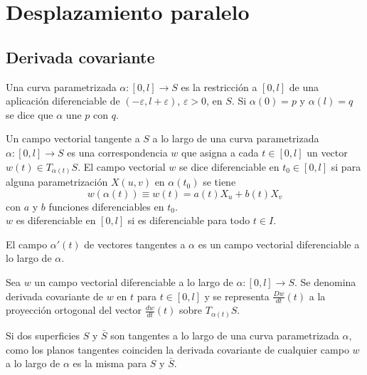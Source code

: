\chapter{Desplazamiento paralelo}
\section{Derivada covariante}

\begin{definition}
    Una curva parametrizada $\alpha : [0, l] \to S$ es la restricción a $[0, l]$ de una aplicación diferenciable de $(-\varepsilon, l+\varepsilon)$, $\varepsilon>0$, en $S$.
    Si $\alpha(0) = p$ y $\alpha(l) = q$ se dice que $\alpha$ une $p$ con $q$.
\end{definition}

\begin{definition}
    Un campo vectorial tangente a $S$ a lo largo de una curva parametrizada $\alpha : [0, l] \to S$ es una correspondencia $w$ que asigna a cada $t \in [0, l]$ un vector $w(t) \in T_{\alpha(t)}S$.
    El campo vectorial $w$ se dice diferenciable en $t_0 \in [0, l]$ si para alguna parametrización $X(u, v)$ en $\alpha(t_0)$ se tiene
    $$w(\alpha(t)) \equiv w(t) = a(t)X_u + b(t)X_v$$
    con $a$ y $b$ funciones diferenciables en $t_0$.\\
    $w$ es diferenciable en $[0, l]$ si es diferenciable para todo $t \in I$.
\end{definition}

\begin{example}
    El campo $\alpha'(t)$ de vectores tangentes a $\alpha$ es un campo vectorial diferenciable a lo largo de $\alpha$.
\end{example}

\begin{definition}
    Sea $w$ un campo vectorial diferenciable a lo largo de $\alpha : [0, l] \to S$.
    Se denomina derivada covariante de $w$ en $t$ para $t \in [0, l]$ y se representa $\frac{Dw}{dt}(t)$ a la proyección ortogonal del vector $\frac{dw}{dt}(t)$ sobre $T_{\alpha(t)}S$.
\end{definition}

\begin{remark}
    Si dos superficies $S$ y $\bar{S}$ son tangentes a lo largo de una curva parametrizada $\alpha$, como los planos tangentes coinciden la derivada covariante de cualquier campo $w$ a lo largo de $\alpha$ es la misma para $S$ y $\bar{S}$.
\end{remark}

